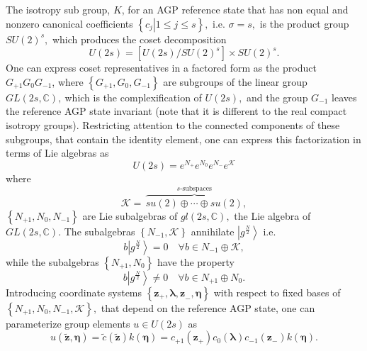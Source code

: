 \documentclass[aps,preprint]{revtex4}%
\begin{document}
The isotropy sub group, $K$, for an AGP reference state that has non equal and
nonzero canonical coefficients $\left\{  \left.  c_{j}\right\vert 1\leq j\leq
s\right\}  ,$ i.e. $\sigma=s,$ is the product group $SU\left(  2\right)
^{s},$ which produces the coset decomposition
\begin{equation}
U\left(  2s\right)  =\left[  U\left(  2s\right)  /SU\left(  2\right)
^{s}\right]  \times SU\left(  2\right)  ^{s}.
\end{equation}
One can express coset representatives in a factored form as the product
$G_{+1}G_{0}G_{-1}$, \cite{Zhang90} where $\left\{  G_{+1},G_{0}%
,G_{-1}\right\}  $ are subgroups of the linear group $GL\left(  2s,\mathbb{C}%
\right)  ,\ $which is the complexification of $U\left(  2s\right)  ,$ and the
group $G_{-1}$ leaves the reference AGP state invariant (note that it is
different to the real compact isotropy groups). Restricting attention to the
connected components of these subgroups, that contain the identity element,
one can express this factorization in terms of Lie algebras as
\begin{equation}
U\left(  2s\right)  =e^{N_{+}}e^{N_{0}}e^{N_{-}}e^{\mathcal{K}}%
\end{equation}
where
\begin{equation}
\mathcal{K}=\,\overset{s\text{-subspaces}}{\overbrace{su\left(  2\right)
\oplus\cdots\oplus su\left(  2\right)  }},
\end{equation}
$\left\{  N_{+1},N_{0},N_{-1}\right\}  $ are Lie subalgebras of $gl\left(
2s,\mathbb{C}\right)  ,$ the Lie algebra of $GL\left(  2s,\mathbb{C}\right)
$. The subalgebras $\left\{  N_{-1},\mathcal{K}\right\}  $ annihilate
$\left\vert g^{\frac{N}{2}}\right\rangle $ i.e.
\begin{equation}
b\left\vert g^{\frac{N}{2}}\right\rangle =0\quad\forall b\in N_{-1}%
\oplus\mathcal{K},
\end{equation}
while the subalgebras $\left\{  N_{+1},N_{0}\right\}  $ have the property
\begin{equation}
b\left\vert g^{\frac{N}{2}}\right\rangle \neq0\quad\forall b\in N_{+1}\oplus
N_{0}.
\end{equation}
Introducing coordinate systems $\left\{  \mathbf{z}_{+},\mathbf{\lambda,z}%
_{-},\mathbf{\eta}\right\}  $ with respect to fixed bases of $\left\{
N_{+1},N_{0},N_{-1},\mathcal{K}\right\}  ,$ that depend on the reference AGP
state, one can parameterize group elements $u\in U\left(  2s\right)  $ as
\begin{equation}
u\left(  \mathbf{\tilde{z},\eta}\right)  =\tilde{c}\left(  \mathbf{\tilde{z}%
}\right)  k\left(  \mathbf{\eta}\right)  =c_{+1}\left(  \mathbf{z}_{+}\right)
c_{0}\left(  \mathbf{\lambda}\right)  c_{-1}\left(  \mathbf{z}_{-}\right)
k\left(  \mathbf{\eta}\right)  .
\end{equation}
\end{document}
